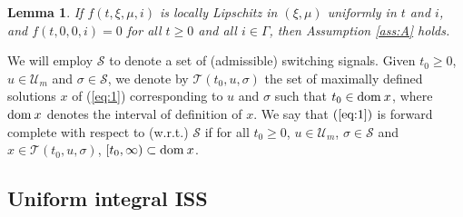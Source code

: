 \documentclass[9pt,final,journal]{IEEEtran}
\newtheorem{lema}{Lemma}
\def\S{\mathcal{S}}
\def\T{\mathcal{T}}
\def\U{\mathcal{U}}
\def\dom{{\rm dom}}
\begin{document}
\begin{lema} \label{lem:loc-lips} If $f(t,\xi,\mu,i)$ is locally Lipschitz 
in $(\xi,\mu)$ uniformly in $t$ and $i$, and $f(t,0,0,i)=0$ for all $t\ge 0$ and all $i\in\Gamma$, then Assumption \ref{ass:A} holds.
\end{lema}

We will employ $\S$ to denote a set of (admissible) switching signals. Given $t_0\ge 0$, $u\in \U_m$ and $\sigma\in \S$, we denote by $\T(t_0,u,\sigma)$ the set of maximally defined solutions $x$ of (\ref{eq:1}) corresponding to $u$ and $\sigma$ such that $t_0\in \dom \:x$, where $\dom\:x$ denotes the interval of definition of $x$. We say that $(\ref{eq:1})$ is forward complete with respect to (w.r.t.) $\S$ if for all $t_0\ge 0$, $u\in \U_m$, $\sigma\in \S$ and $x\in \T(t_0,u,\sigma)$, $[t_0,\infty)\subset \dom\:x$.


\subsection{Uniform integral ISS}
\label{sec:unifiiss}
\end{document}
